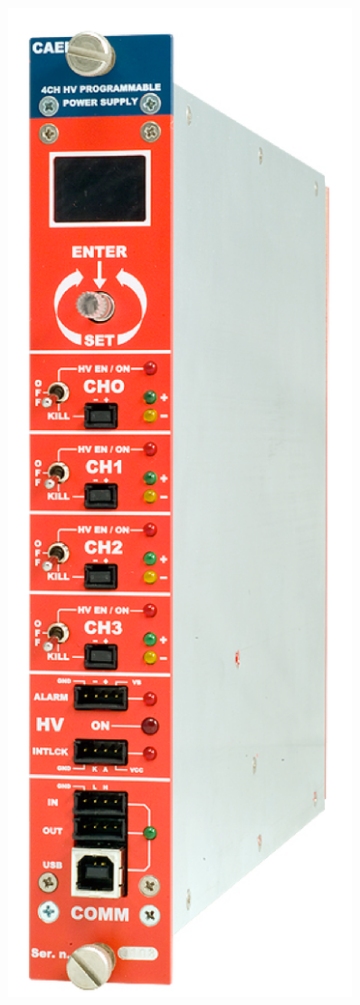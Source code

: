 \begin{figure}
    \hfill
    \begin{subfigure}[t]{0.2\textwidth}
        \includegraphics[height=0.25\textheight, width=\textwidth, keepaspectratio]{figures/Alim2.png}

\end{subfigure}
\end{figure}
